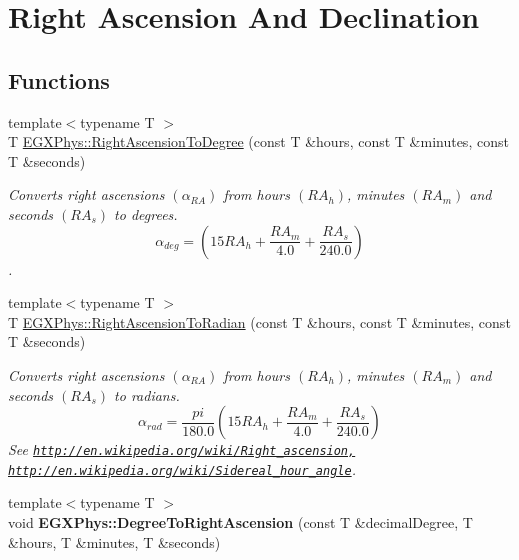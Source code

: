 \hypertarget{group___e_g_x_phys-_right_ascension_and_declination}{}\section{Right Ascension And Declination}
\label{group___e_g_x_phys-_right_ascension_and_declination}
\subsection*{Functions}
\begin{DoxyCompactItemize}
\item 
{\footnotesize template$<$typename T $>$ }\\T \mbox{\hyperlink{group___e_g_x_phys-_right_ascension_and_declination_ga30e95e529dac871efc014c8ca0108c0d}{E\+G\+X\+Phys\+::\+Right\+Ascension\+To\+Degree}} (const T \&hours, const T \&minutes, const T \&seconds)
\begin{DoxyCompactList}\small\item\em Converts right ascensions $(\alpha_{RA})$ from hours $(RA_h)$, minutes $(RA_m)$ and seconds $(RA_s)$ to degrees. \[\alpha_{deg}=(15 RA_h + \frac{RA_m}{4.0} + \frac{RA_s}{240.0})\]. \end{DoxyCompactList}\item 
{\footnotesize template$<$typename T $>$ }\\T \mbox{\hyperlink{group___e_g_x_phys-_right_ascension_and_declination_gad90de181361375b745a9b226fa13ba14}{E\+G\+X\+Phys\+::\+Right\+Ascension\+To\+Radian}} (const T \&hours, const T \&minutes, const T \&seconds)
\begin{DoxyCompactList}\small\item\em Converts right ascensions $(\alpha_{RA})$ from hours $(RA_h)$, minutes $(RA_m)$ and seconds $(RA_s)$ to radians. \[\alpha_{rad}=\frac{pi}{180.0}(15 RA_h + \frac{RA_m}{4.0} + \frac{RA_s}{240.0})\] See \href{http://en.wikipedia.org/wiki/Right_ascension,}{\tt http\+://en.\+wikipedia.\+org/wiki/\+Right\+\_\+ascension,} \href{http://en.wikipedia.org/wiki/Sidereal_hour_angle}{\tt http\+://en.\+wikipedia.\+org/wiki/\+Sidereal\+\_\+hour\+\_\+angle}. \end{DoxyCompactList}\item 
\mbox{\label{group___e_g_x_phys-_right_ascension_and_declination_gabdd9d1c686dd5e2580518f526b78295f}} 
{\footnotesize template$<$typename T $>$ }\\void {\bfseries E\+G\+X\+Phys\+::\+Degree\+To\+Right\+Ascension} (const T \&decimal\+Degree, T \&hours, T \&minutes, T \&seconds)

\end{DoxyCompactItemize}
